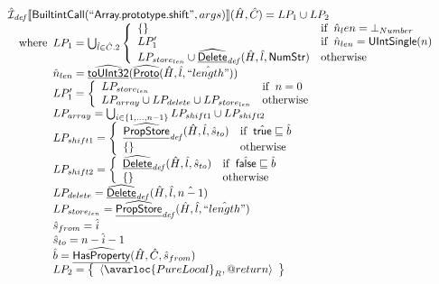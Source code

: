 \[\begin{array}{l}
\aI_{\it def}\lbr \SF{BuiltintCall}(``\SF{Array.prototype.shift}",args)\rbr(\hat{H},\hat{C}) = LP_1 \cup LP_2\\
\quad\wherec{
  LP_1 = \bigcup_{\hat{l} \in \hat{C}.2} \left\{\begin{array}{ll}
      \set{} & \ifc{\hat{n}_len = \bot_{Number}}\\
      LP_1' & \ifc{\hat{n}_{len} = \SF{UIntSingle}(n)}\\
      LP_{store_{len}} \cup
        \ahf{Delete}_{\it def}(\hat{H}, \hat{l}, \SF{NumStr}) & \owc
    \end{array}\right.\\
  \hat{n}_{len} = \ahf{toUInt32}(\ahf{Proto}(\hat{H}, \hat{l}, \hat{``length"}))\\    
  LP_1' = \left\{\begin{array}{ll}
      LP_{store_{len}} & \ifc{n = 0}\\
      LP_{array} \cup LP_{delete} \cup LP_{store_{len}} & \owc
    \end{array}\right.\\
  LP_{array} = \bigcup_{i \in \{1, ..., n-1\}} LP_{shift1} \cup LP_{shift2}\\
  LP_{shift1} = \left\{\begin{array}{ll}
      \ahf{PropStore}_{\it def}(\hat{H}, \hat{l}, \hat{s}_{to}) & \ifc{\atrue \sqsubseteq \hat{b}}\\
      \set{} & \owc
    \end{array}\right.\\
  LP_{shift2} = \left\{\begin{array}{ll}
      \ahf{Delete}_{\it def}(\hat{H}, \hat{l}, \hat{s}_{to}) & \ifc{\afalse \sqsubseteq \hat{b}}\\
      \set{} & \owc
    \end{array}\right.\\
  LP_{delete} = \ahf{Delete}_{\it def}(\hat{H}, \hat{l}, \hat{n-1})\\
  LP_{store_{len}} = \ahf{PropStore}_{\it def}(\hat{H}, \hat{l}, \hat{``length"})\\
  \hat{s}_{from} = \hat{i}\\
  \hat{s}_{to} = \hat{n-i-1}\\
  \hat{b} = \ahf{HasProperty}(\hat{H},\hat{C},\hat{s}_{from})\\
  LP_2 = \set{\langle\avarloc{PureLocal}_R,\varprop{return}\rangle}\\
  }\\
\\

\end{array}
\]
